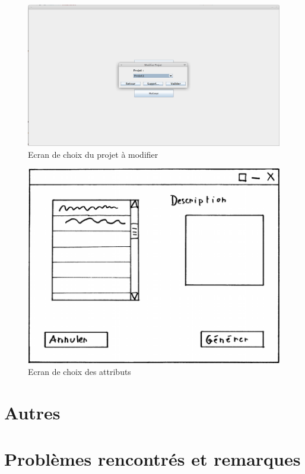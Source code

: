 \documentclass[12pt]{report}
\begin{document}
\begin{figure}
\centering
\includegraphics[scale=0.3]{IHM/modifier_projet_admin.png}
\caption{Ecran de choix du projet à modifier}
\end{figure}
\begin{figure}
\centering
\includegraphics[scale=0.25]{Generation.png}
\caption{Ecran de choix des attributs}
\end{figure}

\section{Autres}

\section{Problèmes rencontrés et remarques}
\end{document}

